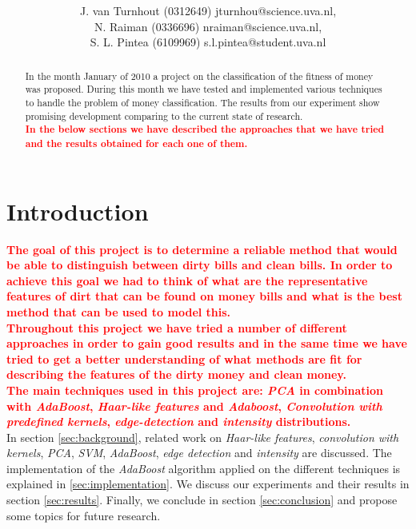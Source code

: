 \documentclass[11pt,twocolumn]{article}
\title{\tbf{Dirty Money:}\\\tbf{Feature selection using AdaBoost}}
\author{J. van Turnhout (0312649) jturnhou@science.uva.nl, \\ N. Raiman (0336696) nraiman@science.uva.nl, \\ S. L. Pintea (6109969) s.l.pintea@student.uva.nl}
\newcommand{\todo}[1]{\textcolor{red}{\textbf{#1}}}
\begin{document}
	\maketitle
	\begin{abstract}
	\hspace*{10px}In the month January of 2010 a project on the classification of the fitness of money was proposed. During this month we have tested and implemented various techniques to handle the problem of money classification. The results from our experiment show promising development comparing to the current state of research.\\
	\todo{\hspace*{10px}In the below sections we have described the approaches that we have tried and the results obtained for each one of them.}
	\end{abstract}
	\section{Introduction}
		\todo{\hspace*{10px}The goal of this project is to determine a reliable method that would be able to distinguish between dirty bills and clean bills. In order to achieve this goal we had to think of what are the representative features of dirt that can be found on money bills and what is the best method that can be used to model this.\\} 
		\todo{\hspace*{10px}Throughout this project we have tried a number of different approaches in order to gain good results and in the same time we have tried to get a better understanding of what methods are fit for describing the features of the dirty money and clean money.\\}
		\todo{\hspace*{10px}The main techniques used in this project are: \emph{PCA} in combination with \emph{AdaBoost}, \emph{Haar-like features} and \emph{Adaboost}, \emph{Convolution with predefined kernels}, \emph{edge-detection} and \emph{intensity} distributions.\\}
		\hspace*{10px}In section \ref{sec:background}, related work on \emph{Haar-like features}, \emph{convolution with kernels}, \emph{PCA}, \emph{SVM}, \emph{AdaBoost}, \emph{edge detection} and \emph{intensity} are discussed. The implementation of the \emph{AdaBoost} algorithm applied on the different techniques is explained in \ref{sec:implementation}. We discuss our experiments and their results in section \ref{sec:results}. Finally, we conclude in section \ref{sec:conclusion} and propose some topics for future research.
\end{document}
